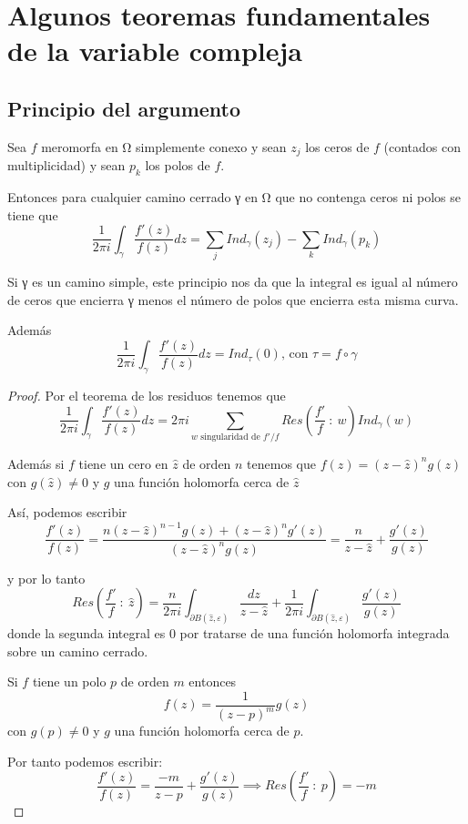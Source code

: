 \documentclass{apuntes}
\begin{document}
\chapter{Algunos teoremas fundamentales de la variable compleja}
\section{Principio del argumento}
\begin{theorem}
Sea $f$ meromorfa en Ω simplemente conexo y sean $z_j$ los ceros de $f$ (contados con multiplicidad) y sean $p_k$ los polos de $f$.

Entonces para cualquier camino cerrado γ en Ω que no contenga ceros ni polos se tiene que
\[\frac{1}{2πi}\int_γ\frac{f'(z)}{f(z)}dz = \sum_j Ind_γ(z_j)-\sum_k Ind_γ(p_k)\]

Si γ es un camino simple, este principio nos da que la integral es igual al número de ceros que encierra γ menos el número de polos que encierra esta misma curva.

Además
\[\frac{1}{2\pi i}\int_γ \frac{f'(z)}{f(z)} dz = Ind_τ(0) \text{, con } τ=f\circ γ\]
\end{theorem}

\begin{proof}
Por el teorema de los residuos tenemos que
\[\frac{1}{2πi}\int_γ \frac{f'(z)}{f(z)}dz = 2πi\sum_{w \text{ singularidad de } f'/f} Res\left(\frac{f'}{f} \ : \ w\right)Ind_γ(w)\]

Además si $f$ tiene un cero en $\hat{z}$ de orden $n$ tenemos que $f(z)=(z-\hat{z})^ng(z)$ con $g(\hat{z})\neq 0$ y $g$ una función holomorfa cerca de $\hat{z}$

Así, podemos escribir
\[\frac{f'(z)}{f(z)} = \frac{n(z-\hat{z})^{n-1}g(z)+(z-\hat{z})^{n} g'(z)}{(z-\hat{z})^n g(z)} = \frac{n}{z-\hat{z}}+\frac{g'(z)}{g(z)}\]

y por lo tanto
\[Res\left( \frac{f'}{f}\ : \ \hat{z}\right) = \frac{n}{2πi}\int_{\partial B(\hat{z},ε)}\frac{dz}{z-\hat{z}} + \frac{1}{2πi}\int_{\partial B(\hat{z},ε)}\frac{g'(z)}{g(z)}\]
donde la segunda integral es 0 por tratarse de una función holomorfa integrada sobre un camino cerrado.

Si $f$ tiene un polo $p$ de orden $m$ entonces
\[f(z)=\frac{1}{(z-p)^m}g(z)\]
con $g(p)\neq 0$ y $g$ una función holomorfa cerca de $p$.

Por tanto podemos escribir:
\[\frac{f'(z)}{f(z)} = \frac{-m}{z-p}+\frac{g'(z)}{g(z)} \implies Res\left( \frac{f'}{f} \ : \ p \right)=-m\]

\end{proof}
\end{document}

